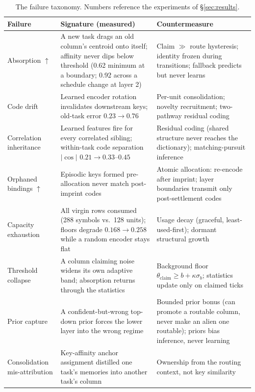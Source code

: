 \documentclass[11pt]{article}
\begin{document}
\begin{table}[ht]
\centering\small
\begin{tabular}{p{3.2cm} p{5.6cm} p{5.6cm}}
\toprule
\textbf{Failure} & \textbf{Signature (measured)} & \textbf{Countermeasure}\\
\midrule
Absorption $\uparrow$ & A new task drags an old column's centroid onto
itself; affinity never dips below threshold (0.62 minimum at a boundary;
0.92 across a schedule change at layer 2) & Claim $\gg$ route hysteresis;
identity frozen during transitions; fallback predicts but never learns\\
\addlinespace
Code drift & Learned encoder rotation invalidates downstream keys;
old-task error $0.23 \to 0.76$ & Per-unit consolidation; novelty
recruitment; two-pathway residual coding\\
\addlinespace
Correlation inheritance & Learned features fire for every correlated
sibling; within-task code separation $|\!\cos\!|$ $0.21 \to 0.33$--$0.45$
& Residual coding (shared structure never reaches the dictionary);
matching-pursuit inference\\
\addlinespace
Orphaned bindings $\uparrow$ & Episodic keys formed pre-allocation never
match post-imprint codes & Atomic allocation: re-encode after imprint;
layer boundaries transmit only post-settlement codes\\
\addlinespace
Capacity exhaustion & All virgin rows consumed (288 symbols vs.\ 128
units); floors degrade $0.168 \to 0.258$ while a random encoder stays flat
& Usage decay (graceful, least-used-first); dormant structural growth\\
\addlinespace
Threshold collapse & A column claiming noise widens its own adaptive band;
absorption returns through the statistics & Background floor
$\theta_{\mathrm{claim}} \ge b + \kappa\sigma_b$; statistics update only on
claimed ticks\\
\addlinespace
Prior capture & A confident-but-wrong top-down prior forces the lower layer
into the wrong regime & Bounded prior bonus (can promote a routable column,
never make an alien one routable); priors bias inference, never learning\\
\addlinespace
Consolidation mis-attribution & Key-affinity anchor assignment distilled
one task's memories into another task's column & Ownership from the routing
context, not key similarity\\
\bottomrule
\end{tabular}
\caption{The failure taxonomy. Numbers reference the experiments of
\S\ref{sec:results}.}
\label{tab:taxonomy}
\end{table}
\end{document}

